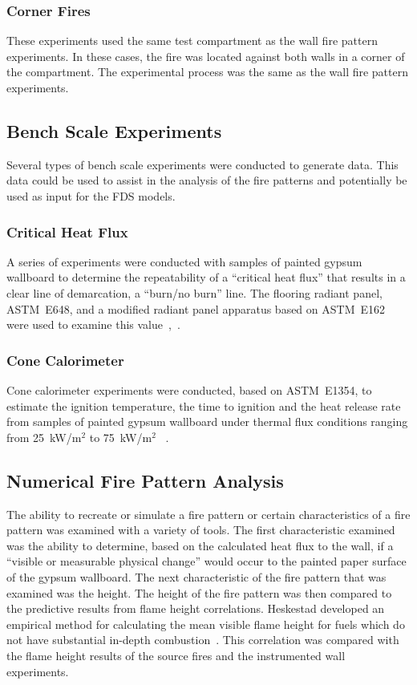 \documentclass[twoside]{uocthesis}
\begin{document}
{\subsubsection{Corner Fires}

These experiments used the same test compartment as the wall fire pattern experiments.  In these cases, the fire was located against both walls in a corner of the compartment.  The experimental process was the same as the wall fire pattern experiments.

\subsection{Bench Scale Experiments}

Several types of bench scale experiments were conducted to generate data. This data could be used to assist in the analysis of the fire patterns and potentially be used as input for the FDS models.

\subsubsection{Critical Heat Flux}

A series of experiments were conducted with samples of painted gypsum wallboard to determine the repeatability of a ``critical heat flux'' that results in a clear line of demarcation, a ``burn/no burn'' line.  The flooring radiant panel, ASTM~E648, and a modified radiant panel apparatus based on ASTM~E162 were used to examine this value~\cite{ASTM_E648},~\cite{ASTM_E162}.

\subsubsection{Cone Calorimeter}

Cone calorimeter experiments were conducted, based on ASTM~E1354, to estimate the ignition temperature, the time to ignition and the heat release rate from samples of painted gypsum wallboard under thermal flux conditions ranging from 25~kW/m$^2$ to 75~kW/m$^2$ ~\cite{ASTM_E1354}.

\subsection{Numerical Fire Pattern Analysis}

The ability to recreate or simulate a fire pattern or certain characteristics of a fire pattern was examined with a variety of tools.  The first characteristic examined was the ability to determine, based on the calculated heat flux to the wall, if a ``visible or measurable physical change'' would occur to the painted paper surface of the gypsum wallboard.  The next characteristic of the fire pattern that was examined was the height.  The height of the fire pattern was then compared to the predictive results from flame height correlations. Heskestad developed an empirical method for calculating the mean visible flame height for fuels which do not have substantial in-depth combustion~\cite{Beyler:1986,Heskestad:SFPE}. This correlation was compared with the flame height results of the source fires and the instrumented wall experiments.

}
\end{document}
